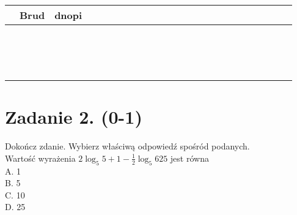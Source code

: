 \documentclass[10pt]{article}
\begin{document}
\begin{center}
\begin{tabular}{|c|c|c|c|c|c|c|c|c|c|c|c|c|c|c|c|c|c|c|c|c|c|c|c|}
\hline
 & Brud & dnopi &  &  &  &  &  &  &  &  &  &  &  &  &  &  &  &  &  &  &  &  &  \\
\hline
 &  &  &  &  &  &  &  &  &  &  &  &  &  &  &  &  &  &  &  &  &  &  &  \\
\hline
 &  &  &  &  &  &  &  &  &  &  &  &  &  &  &  &  &  &  &  &  &  &  &  \\
\hline
 &  &  &  &  &  &  &  &  &  &  &  &  &  &  &  &  &  &  &  &  &  &  &  \\
\hline
 &  &  &  &  &  &  &  &  &  &  &  &  &  &  &  &  &  &  &  &  &  &  &  \\
\hline
 &  &  &  &  &  &  &  &  &  &  &  &  &  &  &  &  &  &  &  &  &  &  &  \\
\hline
 &  &  &  &  &  &  &  &  &  &  &  &  &  &  &  &  &  &  &  &  &  &  &  \\
\hline
 &  &  &  &  &  &  &  &  &  &  &  &  &  &  &  &  &  &  &  &  &  &  &  \\
\hline
 &  &  &  &  &  &  &  &  &  &  &  &  &  &  &  &  &  &  &  &  &  &  &  \\
\hline
 &  &  &  &  &  &  &  &  &  &  &  &  &  &  &  &  &  &  &  &  &  &  &  \\
\hline
 &  &  &  &  &  &  &  &  &  &  &  &  &  &  &  &  &  &  &  &  &  &  &  \\
\hline
 &  &  &  &  &  &  &  &  &  &  &  &  &  &  &  &  &  &  &  &  &  &  &  \\
\hline
 &  &  &  &  &  &  &  &  &  &  &  &  &  &  &  &  &  &  &  &  &  &  &  \\
\hline
 &  &  &  &  &  &  &  &  &  &  &  &  &  &  &  &  &  &  &  &  &  &  &  \\
\hline
 &  &  &  &  &  &  &  &  &  &  &  &  &  &  &  &  &  &  &  &  &  &  &  \\
\hline
 &  &  &  &  &  &  &  &  &  &  &  &  &  &  &  &  &  &  &  &  &  &  &  \\
\hline
\end{tabular}
\end{center}

\section*{Zadanie 2. (0-1)}
Dokończ zdanie. Wybierz właściwą odpowiedź spośród podanych.\\
Wartość wyrażenia \(2 \log _{5} 5+1-\frac{1}{2} \log _{5} 625\) jest równa\\
A. 1\\
B. 5\\
C. 10\\
D. 25
\end{document}

